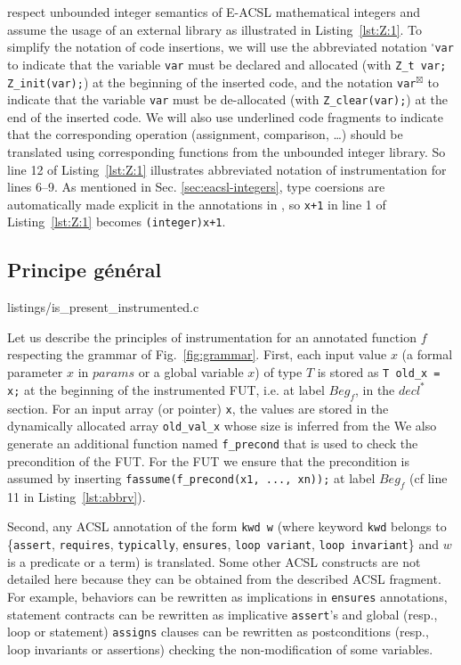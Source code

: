 respect unbounded integer semantics of E-ACSL mathematical integers and
assume the usage of an external library as illustrated in Listing~\ref{lst:Z:1}.
To simplify the notation of code insertions, we will use the abbreviated notation
${}^{\square}$\lstinline{var} 
to indicate that the variable \lstinline{var} must be declared and
allocated (with \lstinline{Z_t var; Z_init(var);})
at the beginning of the inserted code, and the notation
\lstinline{var}${}^{\boxtimes}$ 
to indicate that the variable \lstinline{var} must be de-allocated
(with \lstinline{Z_clear(var);})
at the end of the inserted code.
We will also use underlined code fragments to indicate that the corresponding
operation (assignment, comparison, \dots) should be translated using
corresponding functions from the unbounded integer library.
So line 12 of Listing~\ref{lst:Z:1} illustrates abbreviated notation of 
instrumentation for lines 6--9.
As mentioned in Sec. \ref{sec:eacsl-integers}, %
type coersions  
are automatically made explicit in the annotations in \framac, 
so \lstinline'x+1' in line 1 of Listing~\ref{lst:Z:1}  becomes \lstinline'(integer)x+1'.


\subsection{Principe général}
\label{sec:principles}



                {listings/is_present_instrumented.c}


Let us describe the principles of instrumentation for an annotated function
$f$ respecting the grammar of Fig.~\ref{fig:grammar}.
First, each input value $x$ (a formal parameter $x$ in $params$ or a global variable $x$) of type
$T$ is stored as \lstinline|T old_x = x;|
at the beginning of the instrumented FUT, i.e. at label $Beg_f$, in
the $decl^*$ section.
For an input array  (or pointer) \lstinline'x', the values are stored in the dynamically
allocated array \lstinline'old_val_x' whose size is inferred from the
We also generate an additional function named \lstinline'f_precond'
that is used to check the precondition of the FUT. For the  FUT  we ensure
that the precondition is assumed by inserting 
\lstinline|fassume(f_precond(x1, ..., xn));| 
at label $Beg_{f}$
(cf line 11 in Listing~\ref{lst:abbrv}).

Second, any \textsc{ACSL} annotation of the form \lstinline|kwd w| (where
keyword \lstinline|kwd| belongs to \{\lstinline|assert|, \lstinline|requires|,
\lstinline|typically|, \lstinline|ensures|, \lstinline|loop variant|,
\lstinline|loop invariant|\} and $w$ is a predicate or a term) is translated.
Some other \textsc{ACSL} constructs are not detailed here because they can be
obtained from the described \textsc{ACSL} fragment. For example, behaviors can
be rewritten as implications in \lstinline|ensures| annotations,
statement contracts can be rewritten as implicative \lstinline|assert|'s and
global (resp., loop or statement)
\lstinline|assigns| clauses can be rewritten as postconditions
(resp., loop invariants or assertions)
checking the non-modification of some variables. 

